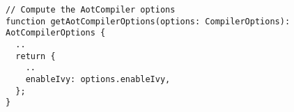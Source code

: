 \begin{verbatim}
// Compute the AotCompiler options
function getAotCompilerOptions(options: CompilerOptions): AotCompilerOptions {
  ..
  return {
    ..
    enableIvy: options.enableIvy,
  };
}
\end{verbatim}
